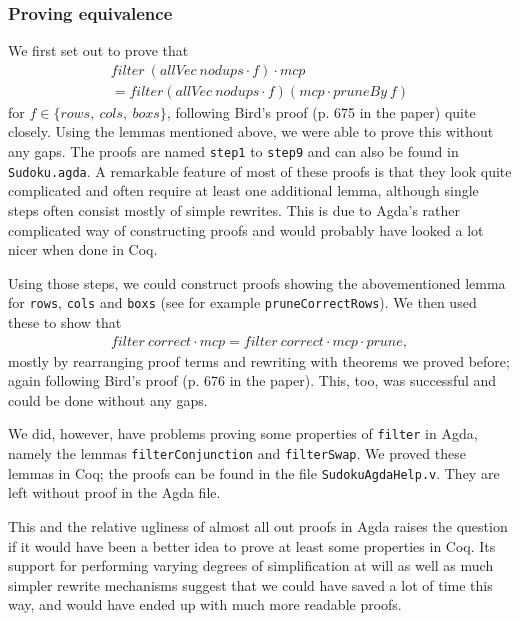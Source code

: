 \documentclass[a4paper,11pt]{article}
\begin{document}
\subsubsection{Proving equivalence}
We first set out to prove that 
\begin{align*}
  filter~(allVec~nodups \cdot f) \cdot mcp \\= filter (allVec~nodups\cdot f) (mcp \cdot pruneBy~f)
\end{align*} 
for $f \in \{rows,~cols,~boxs\}$, following Bird's proof (p. 675 in the paper) quite closely. Using the lemmas mentioned above, we were able to prove this without any gaps. The proofs are named \texttt{step1} to \texttt{step9} and can also be found in \texttt{Sudoku.agda}. A remarkable feature of most of these proofs is that they look quite complicated and often require at least one additional lemma, although single steps often consist mostly of simple rewrites. This is due to Agda's rather complicated way of constructing proofs and would probably have looked a lot nicer when done in Coq.

Using those steps, we could construct proofs showing the abovementioned lemma for \texttt{rows}, \texttt{cols} and \texttt{boxs} (see for example \texttt{pruneCorrectRows}). We then used these to show that 
\begin{align*}
  filter~correct \cdot mcp = filter~correct \cdot mcp \cdot prune,
\end{align*}
mostly by rearranging proof terms and rewriting with theorems we proved before; again following Bird's proof (p. 676 in the paper). This, too, was successful and could be done without any gaps. 

We did, however, have problems proving some properties of \texttt{filter} in Agda, namely the lemmas \texttt{filterConjunction} and \texttt{filterSwap}. We proved these lemmas in Coq; the proofs can be found in the file \texttt{SudokuAgdaHelp.v}. They are left without proof in the Agda file. 

This and the relative ugliness of almost all out proofs in Agda raises the question if it would have been a better idea to prove at least some properties in Coq. Its support for performing varying degrees of simplification at will as well as much simpler rewrite mechanisms suggest that we could have saved a lot of time this way, and would have ended up with much more readable proofs.


\end{document}
